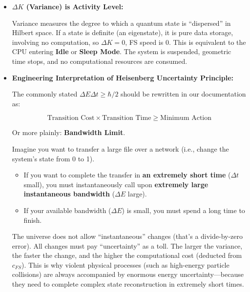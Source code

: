 \begin{itemize}
\item \textbf{$\Delta K$ (Variance) is Activity Level:}

    Variance measures the degree to which a quantum state is ``dispersed'' in Hilbert space. If a state is definite (an eigenstate), it is pure data storage, involving no computation, so \textbf{$\Delta K=0$}, FS speed is 0. This is equivalent to the CPU entering \textbf{Idle} or \textbf{Sleep Mode}. The system is suspended, geometric time stops, and no computational resources are consumed.

\item \textbf{Engineering Interpretation of Heisenberg Uncertainty Principle:}

    The commonly stated \textbf{$\Delta E \Delta t \ge \hbar/2$} should be rewritten in our documentation as:

    $$\text{Transition Cost} \times \text{Transition Time} \ge \text{Minimum Action}$$

    Or more plainly: \textbf{Bandwidth Limit}.

    Imagine you want to transfer a large file over a network (i.e., change the system's state from 0 to 1).

    \begin{itemize}
    \item If you want to complete the transfer in \textbf{an extremely short time} (\textbf{$\Delta t$} small), you must instantaneously call upon \textbf{extremely large instantaneous bandwidth} (\textbf{$\Delta E$} large).

    \item If your available bandwidth (\textbf{$\Delta E$}) is small, you must spend a long time to finish.
    \end{itemize}

    The universe does not allow ``instantaneous'' changes (that's a divide-by-zero error). All changes must pay ``uncertainty'' as a toll. The larger the variance, the faster the change, and the higher the computational cost (deducted from \textbf{$c_{FS}$}). This is why violent physical processes (such as high-energy particle collisions) are always accompanied by enormous energy uncertainty---because they need to complete complex state reconstruction in extremely short times.
\end{itemize}

